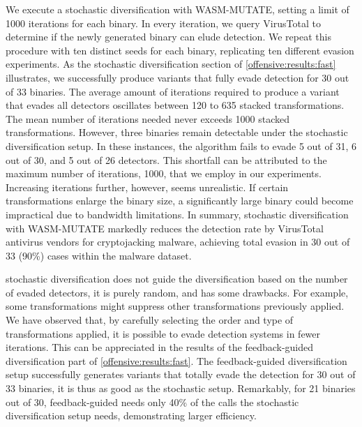 \begin{strategy}
    \label{stochastic_div_vt}
    We execute a stochastic diversification with WASM-MUTATE, setting a limit of 1000 iterations for each binary. 
    In every iteration, we query VirusTotal to determine if the newly generated binary can elude detection. 
    We repeat this procedure with ten distinct seeds for each binary, replicating ten different evasion experiments. 
    As the stochastic diversification section of \autoref{offensive:results:fast} illustrates, we successfully produce variants that fully evade detection for 30 out of 33 binaries. 
    The average amount of iterations required to produce a variant that evades all detectors oscillates between 120 to 635 stacked transformations. 
    The mean number of iterations needed never exceeds 1000 stacked transformations. 
    However, three binaries remain detectable under the stochastic diversification setup. 
    In these instances, the algorithm fails to evade 5 out of 31, 6 out of 30, and 5 out of 26 detectors. 
    This shortfall can be attributed to the maximum number of iterations, 1000, that we employ in our experiments. 
    Increasing iterations further, however, seems unrealistic. 
    If certain transformations enlarge the binary size, a significantly large binary could become impractical due to bandwidth limitations. 
    In summary, stochastic diversification with WASM-MUTATE markedly reduces the detection rate by VirusTotal antivirus vendors for cryptojacking malware, achieving total evasion in 30 out of 33 (90\%) cases within the malware dataset. 
\end{strategy}
    

\begin{strategy}
    \label{guided_div_vt}
    stochastic diversification does not guide the diversification based on the number of evaded detectors, it is purely random, and has some drawbacks.
    For example, some transformations might suppress other transformations previously applied.
    We have observed that, by carefully selecting the order and type of transformations applied, it is possible to evade detection systems in fewer iterations.
    This can be appreciated in the results of the feedback-guided diversification part of \autoref{offensive:results:fast}.
    The feedback-guided diversification setup successfully generates variants that totally evade the detection for 30 out of 33 binaries, it is thus as good as the stochastic setup.
    Remarkably, for 21 binaries out of 30, feedback-guided needs only 40\% of the calls the stochastic diversification setup needs, demonstrating larger efficiency. 


\end{strategy}
  
